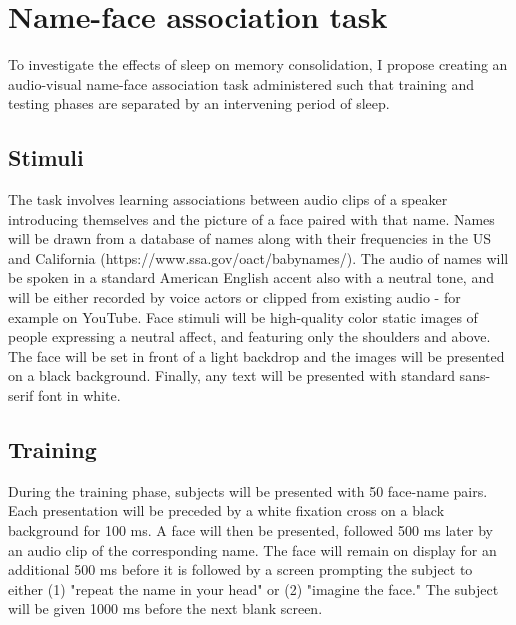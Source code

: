 %
%
\section*{Name-face association task}
To investigate the effects of sleep on memory consolidation, I propose creating an audio-visual name-face association task administered such that training and testing phases are separated by an intervening period of sleep. 

%
\subsection*{Stimuli}
The task involves learning associations between audio clips of a speaker introducing themselves and the picture of a face paired with that name. Names will be drawn from a database of names along with their frequencies in the US and California (https://www.ssa.gov/oact/babynames/). The audio of names will be spoken in a standard American English accent also with a neutral tone, and will be either recorded by voice actors or clipped from existing audio - for example on YouTube. Face stimuli will be high-quality color static images of people expressing a neutral affect, and featuring only the shoulders and above. The face will be set in front of a light backdrop and the images will be presented on a black background. Finally, any text will be presented with standard sans-serif font in white.  

\subsection*{Training}
During the training phase, subjects will be presented with 50 face-name pairs. Each presentation will be preceded by a white fixation cross on a black background for 100 ms. A face will then be presented, followed 500 ms later by an audio clip of the corresponding name. The face will remain on display for an additional 500 ms before it is followed by a screen prompting the subject to either (1) "repeat the name in your head" or (2) "imagine the face." The subject will be given 1000 ms before the next blank screen. 

